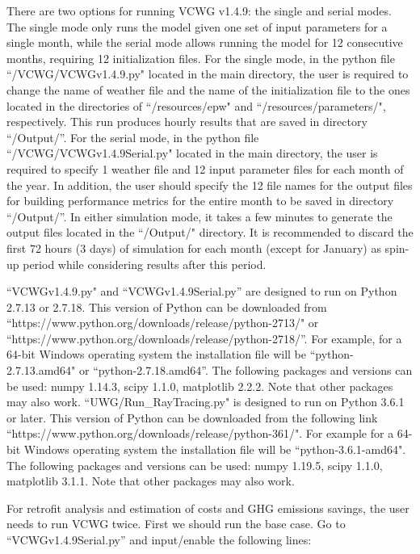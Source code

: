 \documentclass[12pt]{article}
\begin{document}
There are two options for running VCWG v1.4.9: the single and serial modes. The single mode only runs the model given one set of input parameters for a single month, while the serial mode allows running the model for 12 consecutive months, requiring 12 initialization files. For the single mode, in the python file ``/VCWG/VCWGv1.4.9.py" located in the main directory, the user is required to change the name of weather file and the name of the initialization file to the ones located in the directories of ``/resources/epw" and ``/resources/parameters/", respectively. This run produces hourly results that are saved in directory ``/Output/''. For the serial mode, in the python file ``/VCWG/VCWGv1.4.9Serial.py" located in the main directory, the user is required to specify 1 weather file and 12 input parameter files for each month of the year. In addition, the user should specify the 12 file names for the output files for building performance metrics for the entire month to be saved in directory ``/Output/''. In either simulation mode, it takes a few minutes to generate the output files located in the ``/Output/" directory. It is recommended to discard the first 72 hours (3 days) of simulation for each month (except for January) as spin-up period while considering results after this period. 

``VCWGv1.4.9.py" and ``VCWGv1.4.9Serial.py'' are designed to run on Python 2.7.13 or 2.7.18. This version of Python can be downloaded from ``https://www.python.org/downloads/release/python-2713/" or ``https://www.python.org/downloads/release/python-2718/''. For example, for a 64-bit Windows operating system the installation file will be ``python-2.7.13.amd64" or ``python-2.7.18.amd64''. The following packages and versions can be used: numpy 1.14.3, scipy 1.1.0, matplotlib 2.2.2. Note that other packages
may also work. ``UWG/Run\_RayTracing.py" is designed to run on Python 3.6.1 or later. This version of Python can be downloaded from the following link ``https://www.python.org/downloads/release/python-361/". For example for a
64-bit Windows operating system the installation file will be ``python-3.6.1-amd64". The following packages and versions can be used: numpy 1.19.5, scipy 1.1.0, matplotlib 3.1.1. Note that other
packages may also work.

For retrofit analysis and estimation of costs and GHG emissions savings, the user needs to run VCWG twice. First we should run the base case. Go to ``VCWGv1.4.9Serial.py'' and input/enable the following lines:
\end{document}
